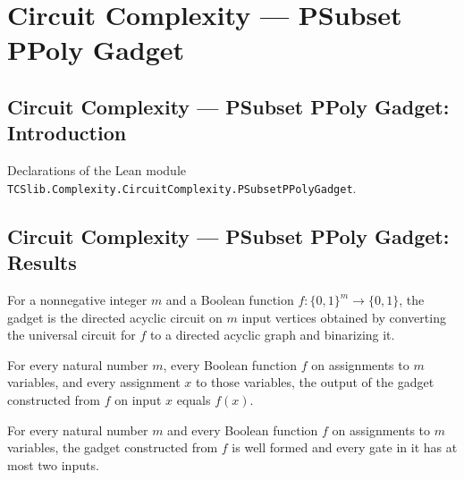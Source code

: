 \section{Circuit Complexity --- PSubset PPoly Gadget}
\subsection*{Circuit Complexity --- PSubset PPoly Gadget: Introduction}

Declarations of the Lean module \texttt{TCSlib.Complexity.CircuitComplexity.PSubsetPPolyGadget}.

\subsection*{Circuit Complexity --- PSubset PPoly Gadget: Results}

\begin{definition}
\label{BoolCircuit.gadget}
\leanok
{}
For a nonnegative integer $m$ and a Boolean function $f:\{0,1\}^m\to\{0,1\}$, the gadget
is the directed acyclic circuit on $m$ input vertices obtained by converting the
universal circuit for $f$ to a directed acyclic graph and binarizing it.
\end{definition}

\begin{theorem}
\label{BoolCircuit.gadget_eval}
\leanok
{}
For every natural number $m$, every Boolean function $f$ on assignments to $m$
variables, and every assignment $x$ to those variables, the output of the gadget
constructed from $f$ on input $x$ equals $f(x)$.
\end{theorem}

\begin{theorem}
\label{BoolCircuit.gadget_isFaninTwo}
\leanok
{}
For every natural number $m$ and every Boolean function $f$ on assignments to $m$
variables, the gadget constructed from $f$ is well formed and every gate in it has at
most two inputs.
\end{theorem}

